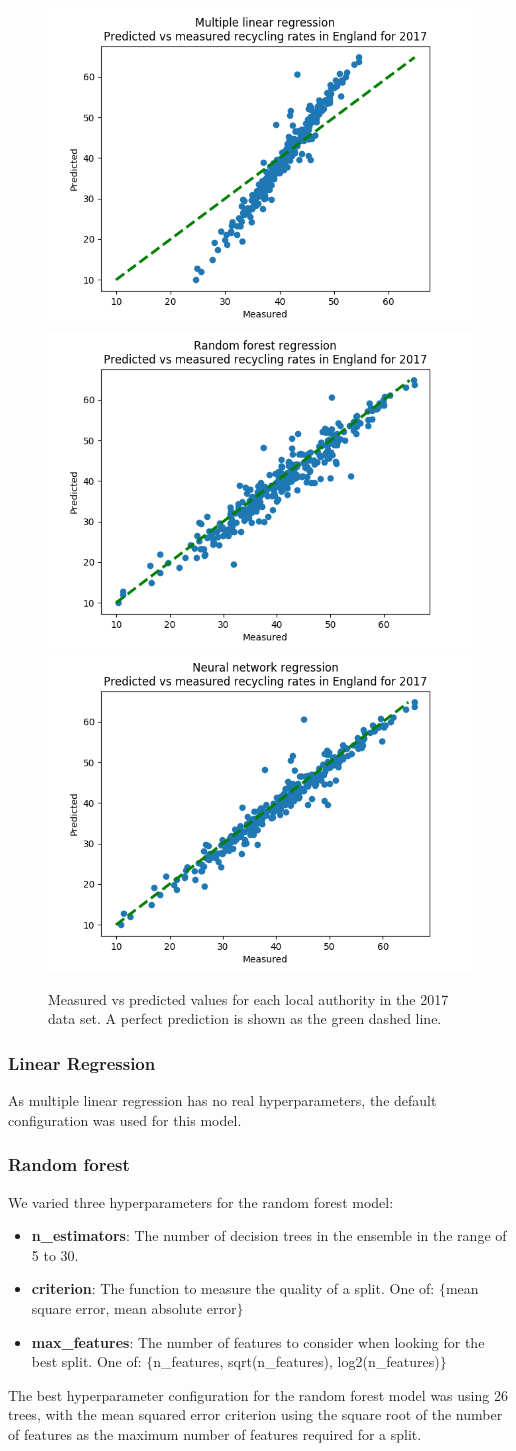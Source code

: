 \documentclass[11pt,conference]{IEEEtran}
\begin{document}
\begin{figure}[htbp]
	\begin{center}
    	\includegraphics[width=0.32\linewidth]{../figures/england_recycling_predicted_mlr_2017.png}
    	\includegraphics[width=0.32\linewidth]{../figures/england_recycling_predicted_rfm_2017.png}
    	\includegraphics[width=0.32\linewidth]{../figures/england_recycling_predicted_mlp_2017.png}
	\caption{Measured vs predicted values for each local authority in the 2017 data set. A perfect prediction is shown as the green dashed line.}
	\label{fig:predictions}
	\end{center}
\end{figure}
\subsubsection{Linear Regression}
As multiple linear regression has no real hyperparameters, the default configuration was used for this model.

\subsubsection{Random forest}
We varied three hyperparameters for the random forest model:

\begin{itemize}
\item \textbf{n\_estimators}: The number of decision trees in the ensemble in the range of 5 to 30.
\item \textbf{criterion}: The function to measure the quality of a split. One of: $\{$mean square error, mean absolute error$\}$

\item \textbf{max\_features}: The number of features to consider when looking for the best split. One of:  $\{$n\_features, sqrt(n\_features), log2(n\_features)$\}$
\end{itemize}
The best hyperparameter configuration for the random forest model was using 26 trees, with the mean squared error criterion using the square root of the number of features as the maximum number of features required for a split.
\end{document}
